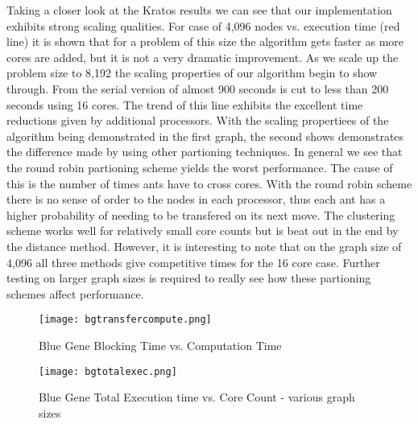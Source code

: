 \documentclass{acm_proc_article-sp}
\begin{document}
Taking a closer look at the Kratos results we can see that our implementation exhibits strong scaling qualities. For case of 4,096 nodes vs. execution time (red line) it is shown that for a problem of this size
the algorithm gets faster as more cores are added, but it is not a very dramatic improvement. As we scale up the problem size to 8,192 the scaling properties of our algorithm begin to show through. From the serial
version of almost 900 seconds is cut to less than 200 seconds using 16 cores. The trend of this line exhibits the excellent time reductions given by additional processors. With the scaling propertiees of the algorithm
being demonstrated in the first graph, the second shows demonstrates the difference made by using other partioning techniques. In general we see that the round robin partioning scheme yields the worst performance. The
cause of this is the number of times ants have to cross cores. With the round robin scheme there is no sense of order to the nodes in each processor, thus each ant has a higher probability of needing to be 
transfered on its next move. The clustering scheme works well for relatively small core counts but is beat out in the end by the distance method. However, it is interesting to note that on the graph size of 4,096 all
three methods give competitive times for the 16 core case. Further testing on larger graph sizes is required to really see how these partioning schemes affect performance.

\begin{figure}[h!]
    \texttt{[image: bgtransfercompute.png]}
    \caption{Blue Gene Blocking Time vs. Computation Time}
\end{figure}

\begin{figure}[h!]
    \texttt{[image: bgtotalexec.png]}
    \caption{Blue Gene Total Execution time vs. Core Count - various graph sizes}
\end{figure}
\end{document}
